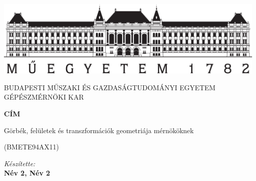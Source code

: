 \documentclass[11pt,a4paper]{article}
\begin{document}
\begin{titlepage}
\centering

\includegraphics[width=.8\textwidth]{bme_logo_nagy.jpg}

\vspace{1em}

{
\large
BUDAPESTI MŰSZAKI ÉS GAZDASÁGTUDOMÁNYI EGYETEM GÉPÉSZMÉRNÖKI KAR
}

\vspace{8em}

{
\Huge
\textbf{CÍM}
}

\vspace{8em}

{
\huge
Görbék, felületek és transzformációk geometriája mérnököknek

\vspace{.2em}

\large
(BMETE94AX11)
}

\vspace{4em}

{
\Large
\textit{Készítette:}\\
\vspace{.5em}
\textbf{Név 2, Név 2 }
}
\vspace{4em}





\end{titlepage}
\end{document}
